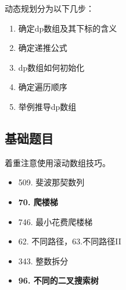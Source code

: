 \documentclass[a4paper,twoside]{ctexart}
\begin{document}
动态规划分为以下几步：
\begin{enumerate}
\item 确定dp数组及其下标的含义
\item 确定递推公式
\item dp数组如何初始化
\item 确定遍历顺序
\item 举例推导dp数组
\end{enumerate}

\subsection{基础题目}
着重注意使用滚动数组技巧。

\begin{itemize}
\item 509. 斐波那契数列
\item \textbf{70. 爬楼梯}
\item 746. 最小花费爬楼梯
\item 62. 不同路径，63.不同路径II
\item 343. 整数拆分
\item \textbf{96. 不同的二叉搜索树}
\end{itemize}
\end{document}
